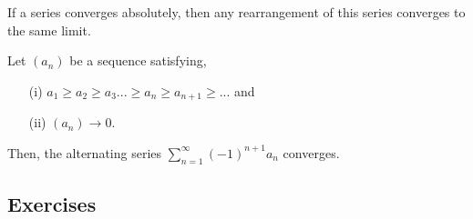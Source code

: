 \begin{tcolorbox}
\begin{thm}
If a series converges absolutely, then any rearrangement of this series converges to the same limit.
\end{thm}
\end{tcolorbox}

\begin{tcolorbox}
    \begin{thm}
    Let \((a_n)\) be a sequence satisfying, 
    \begin{enumerate}
        \item[(i)] \( a_1 \geq a_2 \geq a_3 ... \geq a_n \geq a_{n+1} \geq ... \) and
        \item[(ii)] \((a_n) \to 0\).
    \end{enumerate}
    Then, the alternating series \( \sum_{n=1}^{\infty} (-1)^{n+1} a_n\) converges.
\end{thm}
\end{tcolorbox}





\subsection{Exercises}


